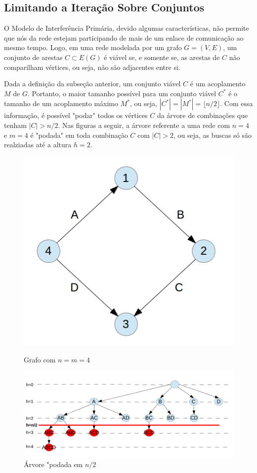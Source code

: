 \subsection{Limitando a Iteração Sobre Conjuntos}

O Modelo de Interferência Primária, devido algumas características, não permite que nós da rede estejam participando de mais de um enlace de comunicação ao mesmo tempo. Logo, em uma rede modelada por um grafo $G=(V,E)$, um conjunto de arestas $C \subset E(G)$ é viável se, e somente se, as arestas de $C$ não comparilham vértices, ou seja, não são adjacentes entre si. 

Dada a definição da subseção anterior, um conjunto viável $C$ é um acoplamento $M$ de $G$. Portanto, o maior tamanho possível para um conjunto viável $C^*$ é o tamanho de um acoplamento máximo $M^*$, ou seja, $|C^*| = |M^*| = \lfloor n/2 \rfloor$. Com essa informação, é possível "podar" todos os vértices $C$ da árvore de combinações que tenham $|C|>n/2$. Nas figuras a seguir, a árvore referente a uma rede com $n=4$ e $m=4$ é "podada" em toda combinação $C$ com $|C| > 2$, ou seja, as buscas só são realziadas até a altura $h=2$.

\begin{figure}[ht] 
  \label{fig:otimizacao} 
  \begin{minipage}[b]{0.5\linewidth}
    \centering
    \includegraphics[width=0.5\linewidth]{figs/otim1.png} 
    \caption{Grafo com $n=m=4$} 
    \vspace{4ex}
  \end{minipage}
  \begin{minipage}[b]{0.5\linewidth}
    \centering
    \includegraphics[width=1\linewidth]{figs/otim2.png} 
    \caption{Árvore "podada em $n/2$} 
    \vspace{4ex}
  \end{minipage} 
\end{figure}

